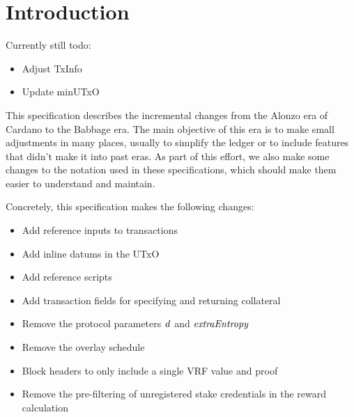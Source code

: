 \section{Introduction}

Currently still todo:

\begin{itemize}
\item Adjust TxInfo
\item Update minUTxO
\end{itemize}

This specification describes the incremental changes from the Alonzo
era of Cardano to the Babbage era. The main objective of this era is
to make small adjustments in many places, usually to simplify the
ledger or to include features that didn't make it into past eras. As
part of this effort, we also make some changes to the notation used in
these specifications, which should make them easier to understand and
maintain.

Concretely, this specification makes the following changes:
\begin{itemize}
\item Add reference inputs to transactions
\item Add inline datums in the UTxO
\item Add reference scripts
\item Add transaction fields for specifying and returning collateral
\item Remove the protocol parameters $\mathit{d}$ and $\mathit{extraEntropy}$
\item Remove the overlay schedule
\item Block headers to only include a single VRF value and proof
\item Remove the pre-filtering of unregistered stake credentials in the reward calculation
\end{itemize}
